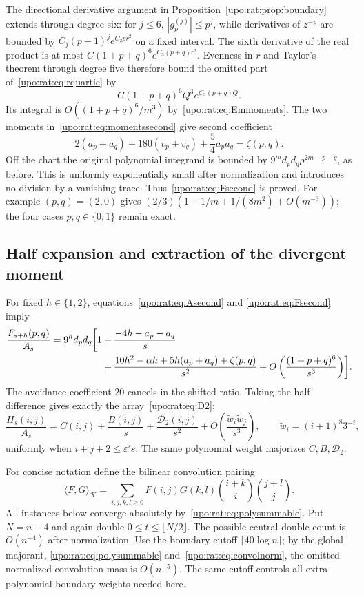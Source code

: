 \documentclass[11pt,letterpaper]{article}
\theoremstyle{remark}\newtheorem{remark}[theorem]{Remark}
\numberwithin{equation}{section}
\begin{document}
The directional derivative argument in Proposition~\ref{upo:rat:prop:boundary}
extends through degree six: for $j\le6$,
$|g_p^{(j)}|\le p^j$, while derivatives of $z^{-p}$ are bounded by
$C_j(p+1)^j e^{C_2pr^2}$ on a fixed interval. The sixth derivative of
the real product is at most
$C(1+p+q)^6e^{C_3(p+q)r^2}$. Evenness in $r$ and Taylor's theorem through
degree five therefore bound the omitted part of~\eqref{upo:rat:eq:rquartic} by
\[
C(1+p+q)^6Q^3e^{C_3(p+q)Q}.
\]
Its integral is $O((1+p+q)^6/m^3)$ by~\eqref{upo:rat:eq:Emmoments}.
The two moments in~\eqref{upo:rat:eq:momentssecond} give second coefficient
\[
2(a_p+a_q)+180(v_p+v_q)+\frac54a_pa_q=\zeta(p,q).
\]
Off the chart the original polynomial integrand is bounded by
$9^m d_pd_q\rho^{2m-p-q}$, as before. This is uniformly exponentially
small after normalization and introduces no division by a vanishing
trace. Thus~\eqref{upo:rat:eq:Fsecond} is proved.
For example $(p,q)=(2,0)$ gives
$(2/3)(1-1/m+1/(8m^2)+O(m^{-3}))$; the four cases $p,q\in\{0,1\}$
remain exact.

\subsection{Half expansion and extraction of the divergent moment}
For fixed $h\in\{1,2\}$, equations~\eqref{upo:rat:eq:Asecond} and
\eqref{upo:rat:eq:Fsecond} imply
\begin{align}\label{upo:rat:eq:Fshiftsecond}
\frac{F_{s+h}(p,q)}{A_s}=9^hd_pd_q\biggl[1
&+\frac{-4h-a_p-a_q}{s}\notag\\
&+\frac{10h^2-\alpha h+5h(a_p+a_q)+\zeta(p,q)}{s^2}
+O\left(\frac{(1+p+q)^6}{s^3}\right)\biggr].
\end{align}
The avoidance coefficient 20 cancels in the shifted ratio. Taking the
half difference gives exactly the array~\eqref{upo:rat:eq:D2}:
\begin{equation}\label{upo:rat:eq:Hsecond}
\frac{H_s(i,j)}{A_s}=C(i,j)+\frac{B(i,j)}s+
\frac{\mathcal D_2(i,j)}{s^2}
+O\left(\frac{\widetilde w_i\widetilde w_j}{s^3}\right),
\qquad \widetilde w_i=(i+1)^8 3^{-i},
\end{equation}
uniformly when $i+j+2\le\varepsilon's$.
The same polynomial weight majorizes $C,B,\mathcal D_2$.

For concise notation define the bilinear convolution pairing
\[
\langle F,G\rangle_{\mathcal K}
=\sum_{i,j,k,l\ge0}F(i,j)G(k,l)
\binom{i+k}{i}\binom{j+l}{j}.
\]
All instances below converge absolutely by~\eqref{upo:rat:eq:polysummable}.
Put $N=n-4$ and again double $0\le t\le\lfloor N/2\rfloor$.
The possible central double count is $O(n^{-4})$ after normalization.
Use the boundary cutoff $\lceil40\log n\rceil$; by the global majorant,
\eqref{upo:rat:eq:polysummable} and~\eqref{upo:rat:eq:convolnorm}, the omitted normalized
convolution mass is $O(n^{-5})$. The same cutoff controls all extra
polynomial boundary weights needed here.
\end{document}
